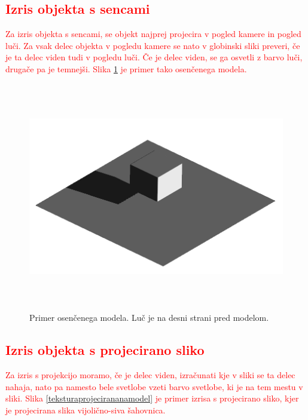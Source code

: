 \documentclass[a4paper, 12pt]{book}
\begin{document}
\textcolor{red}{\subsection*{Izris objekta s sencami}}
\textcolor{red}{Za izris objekta s sencami, se objekt najprej projecira v pogled kamere in pogled luči. Za vsak delec objekta v pogledu kamere se nato v globinski sliki preveri, če je ta delec viden tudi v pogledu luči. Če je delec viden, se ga osvetli z barvo luči, drugače pa je temnejši. Slika \ref{osencenmodel} je primer tako osenčenega modela.}

\begin{figure}[h]
\begin{center}
\includegraphics[width=12cm, height=10cm, keepaspectratio=true]{Osencen_model.png}
\end{center}
\caption{Primer osenčenega modela. Luč je na desni strani pred modelom.}
\label{osencenmodel}
\end{figure}

\textcolor{red}{\subsection*{Izris objekta s projecirano sliko}}
\textcolor{red}{Za izris s projekcijo moramo, če je delec viden, izračunati kje v sliki se ta delec nahaja, nato pa namesto bele svetlobe vzeti barvo svetlobe, ki je na tem mestu v sliki. Slika \ref{teksturaprojecirananamodel} je primer izrisa s projecirano sliko, kjer je projecirana slika vijolično-siva šahovnica.}
\end{document}
